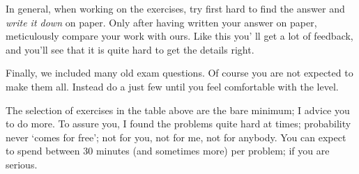 In general, when working on the exercises, try first hard to find the answer and \emph{write it down} on paper.  Only after having written your answer on paper, meticulously compare your work with ours. Like this you' ll get a lot of feedback, and you'll see that it is quite hard to get the details right.

Finally, we included many old exam questions. Of course you are not expected to make them all. Instead  do a just few until you feel comfortable with the level.

The selection of exercises in the table above are the bare minimum; I advice you to do more.
To assure you, I found the problems quite hard at times; probability never `comes for free'; not for you, not for me, not for anybody.
You can expect to spend between 30 minutes (and sometimes more) per problem; if you are serious.


